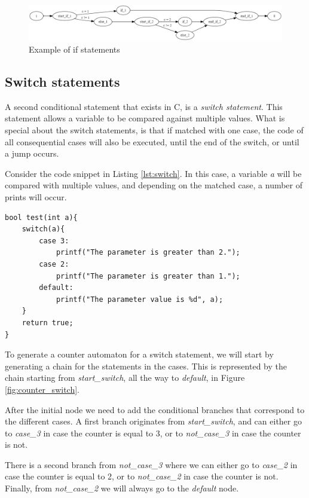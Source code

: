 \documentclass[12pt]{thesis}
\begin{document}
\begin{figure}[h]
	\centering
	\includegraphics[width=\linewidth]{test2_counter_automaton}
	\caption{Example of if statements}
	\label{fig:test2_counter_automaton}
\end{figure}

\subsection{Switch statements}
A second conditional statement that exists in C, is a \textit{switch statement}. This statement allows a variable to be compared against multiple values. What is special about the switch statements, is that if matched with one case, the code of all consequential cases will also be executed, until the end of the switch, or until a jump occurs.

Consider the code snippet in Listing \ref{lst:switch}. In this case, a variable \textit{a} will be compared with multiple values, and depending on the matched case, a number of prints will occur.

\begin{lstlisting}[style=CStyle, caption={Example of a switch statement}, label={lst:switch}]
bool test(int a){
	switch(a){
		case 3:
			printf("The parameter is greater than 2.");
		case 2:
			printf("The parameter is greater than 1.");
		default:
			printf("The parameter value is %d", a);
	}
	return true;
}
\end{lstlisting}

To generate a counter automaton for a switch statement, we will start by generating a chain for the statements in the cases. This is represented by the chain starting from \textit{start\_switch}, all the way to \textit{default}, in Figure \ref{fig:counter_switch}.

After the initial node we need to add the conditional branches that correspond to the different cases. A first branch originates from \textit{start\_switch}, and can either go to \textit{case\_3} in case the counter is equal to 3, or to \textit{not\_case\_3} in case the counter is not.

There is a second branch from \textit{not\_case\_3} where we can either go to \textit{case\_2} in case the counter is equal to 2, or to \textit{not\_case\_2} in case the counter is not. Finally, from \textit{not\_case\_2} we will always go to the \textit{default} node.
\end{document}
